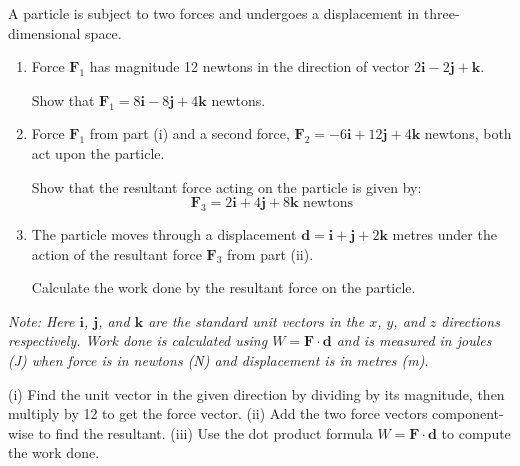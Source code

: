\vspace{1em}

\begin{problem}
A particle is subject to two forces and undergoes a displacement in three-dimensional space.

\begin{enumerate}[label=(\roman*)]
    \item Force $\mathbf{F}_1$ has magnitude 12 newtons in the direction of vector $2\mathbf{i} - 2\mathbf{j} + \mathbf{k}$. 
    
    Show that $\mathbf{F}_1 = 8\mathbf{i} - 8\mathbf{j} + 4\mathbf{k}$ newtons.
    
    \item Force $\mathbf{F}_1$ from part (i) and a second force, $\mathbf{F}_2 = -6\mathbf{i} + 12\mathbf{j} + 4\mathbf{k}$ newtons, both act upon the particle. 
    
    Show that the resultant force acting on the particle is given by:
    $$\mathbf{F}_3 = 2\mathbf{i} + 4\mathbf{j} + 8\mathbf{k} \text{ newtons}$$
    
    \item The particle moves through a displacement $\mathbf{d} = \mathbf{i} + \mathbf{j} + 2\mathbf{k}$ metres under the action of the resultant force $\mathbf{F}_3$ from part (ii).
    
    Calculate the work done by the resultant force on the particle.
\end{enumerate}

\textit{Note: Here $\mathbf{i}$, $\mathbf{j}$, and $\mathbf{k}$ are the standard unit vectors in the $x$, $y$, and $z$ directions respectively. Work done is calculated using $W = \mathbf{F} \cdot \mathbf{d}$ and is measured in joules (J) when force is in newtons (N) and displacement is in metres (m).}
\end{problem}

\begin{hint}
(i) Find the unit vector in the given direction by dividing by its magnitude, then multiply by 12 to get the force vector.
(ii) Add the two force vectors component-wise to find the resultant.
(iii) Use the dot product formula $W = \mathbf{F} \cdot \mathbf{d}$ to compute the work done.
\end{hint}

